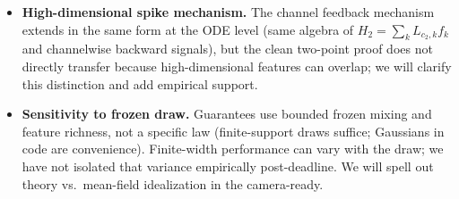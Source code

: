 \documentclass[11pt,a4paper]{article}
\begin{document}
\begin{itemize}
  \item \textbf{High-dimensional spike mechanism.} The channel feedback mechanism extends in the same form at the ODE level (same algebra of $H_2=\sum_k L_{c_2,k}f_k$ and channelwise backward signals), but the clean two-point proof does not directly transfer because high-dimensional features can overlap; we will clarify this distinction and add empirical support.
  \item \textbf{Sensitivity to frozen draw.} Guarantees use bounded frozen mixing and feature richness, not a specific law (finite-support draws suffice; Gaussians in code are convenience). Finite-width performance can vary with the draw; we have not isolated that variance empirically post-deadline. We will spell out theory vs.\ mean-field idealization in the camera-ready.
\end{itemize}
\end{document}
